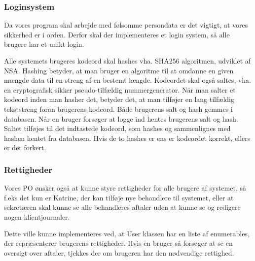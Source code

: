 \subsubsection{Loginsystem}
\label{login}
Da vores program skal arbejde med følsomme persondata er det vigtigt, at vores sikkerhed er i orden.
Derfor skal der implementeres et login system, så alle brugere har et unikt login.

Alle systemets brugeres kodeord skal hashes vha. SHA256 algoritmen, udviklet af NSA.
Hashing betyder, at man bruger en algoritme til at omdanne en given mængde data til en streng af en bestemt længde.
Kodeordet skal også saltes, vha. en cryptografisk sikker pseudo-tilfældig nummergenerator.
Når man salter et kodeord inden man hasher det, betyder det, at man tilføjer en lang tilfældig tekststreng foran brugerens kodeord.
Både brugerens salt og hash gemmes i databasen.
Når en bruger forsøger at logge ind hentes brugerens salt og hash. 
Saltet tilføjes til det indtastede kodeord, som hashes og sammenlignes med hashen hentet fra databasen.
Hvis de to hashes er ens er kodeordet korrekt, ellers er det forkert.\cite{hash}

\subsubsection{Rettigheder}
Vores PO ønsker også at kunne styre rettigheder for alle brugere af systemet, så f.eks det kun er Katrine, der kan tilføje nye behandlere til systemet, eller at sekretæren skal kunne se alle behandleres aftaler uden at kunne se og redigere nogen klientjournaler.

Dette ville kunne implementeres ved, at User klassen har en liste af enumerables, der repræsenterer brugerens rettigheder.
Hvis en bruger så forsøger at se en oversigt over aftaler, tjekkes der om brugeren har den nødvendige rettighed.